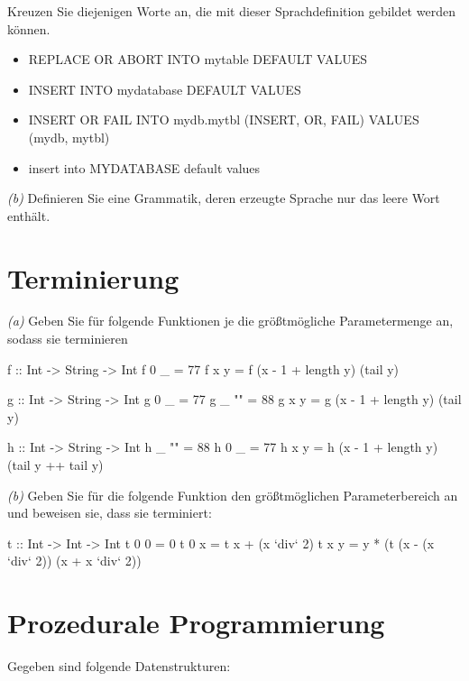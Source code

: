 \documentclass[11pt,a4paper,oneside,ngerman]{scrbook}
\begin{document}
Kreuzen Sie diejenigen Worte an, die mit dieser Sprachdefinition gebildet werden können.
\begin{itemize}[label={\Square}]
  \item REPLACE OR ABORT INTO mytable DEFAULT VALUES
  \item INSERT INTO mydatabase DEFAULT VALUES
  \item INSERT OR FAIL INTO mydb.mytbl (INSERT, OR, FAIL) VALUES (mydb, mytbl)
  \item insert into MYDATABASE default values
\end{itemize}


\emph{(b)} Definieren Sie eine Grammatik, deren erzeugte Sprache nur das leere Wort enthält.


\newpage



\section{Terminierung}

\emph{(a)} Geben Sie für folgende Funktionen je die größtmögliche Parametermenge an, sodass sie terminieren

\begin{code}
  f :: Int -> String -> Int
  f 0 _ = 77
  f x y = f (x - 1 + length y) (tail y)
\end{code}

\begin{code}
  g :: Int -> String -> Int
  g 0 _ = 77
  g _ "" = 88
  g x y = g (x - 1 + length y) (tail y)
\end{code}

\begin{code}
  h :: Int -> String -> Int
  h _ "" = 88
  h 0 _ = 77
  h x y = h (x - 1 + length y) (tail y ++ tail y)
\end{code}


\emph{(b)} Geben Sie für die folgende Funktion den größtmöglichen Parameterbereich an und beweisen sie, dass sie terminiert:

\begin{code}
t :: Int -> Int -> Int
t 0 0 = 0
t 0 x = t x + (x `div` 2)
t x y = y * (t (x - (x `div` 2)) (x + x `div` 2))
\end{code}

\newpage

\section{Prozedurale Programmierung}
Gegeben sind folgende Datenstrukturen:
\end{document}
